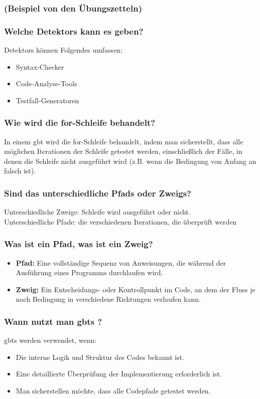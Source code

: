 \documentclass[main.tex]{subfiles}
\begin{document}
\subsubsection*{(Beispiel von den Übungszetteln)} %


\subsubsection*{Welche \glspl{Detektor} kann es geben?}
\glspl{Detektor} können Folgendes umfassen:
\begin{itemize}
    \item Syntax-Checker
    \item Code-Analyse-Tools
    \item Testfall-Generatoren
\end{itemize}

\subsubsection*{Wie wird die for-Schleife behandelt?}
In einem \gls{gbt}  wird die for-Schleife behandelt, indem man sicherstellt, dass alle möglichen Iterationen der Schleife getestet werden, einschließlich der Fälle, in denen die Schleife nicht ausgeführt wird (z.B. wenn die Bedingung von Anfang an falsch ist).


\subsubsection*{Sind das unterschiedliche \glspl{Pfad} oder \glspl{Zweig}?} %
Unterschiedliche Zweige: Schleife wird ausgeführt oder nicht. \\
Unterschiedliche Pfade: die verschiedenen Iterationen, die überprüft werden

\subsubsection*{Was ist ein \gls{Pfad}, was ist ein \gls{Zweig}?}
\begin{itemize}
    \item \textbf{Pfad:} Eine vollständige Sequenz von Anweisungen, die während der Ausführung eines Programms durchlaufen wird.
    \item \textbf{\gls{Zweig}:} Ein Entscheidungs- oder Kontrollpunkt im Code, an dem der Fluss je nach Bedingung in verschiedene Richtungen verlaufen kann.
\end{itemize}


\subsubsection*{Wann nutzt man \glspl{gbt} ?}
\glspl{gbt}  werden verwendet, wenn:
\begin{itemize}
    \item Die interne Logik und Struktur des Codes bekannt ist.
    \item Eine detaillierte Überprüfung der Implementierung erforderlich ist.
    \item Man sicherstellen möchte, dass alle Codepfade getestet werden.
\end{itemize}
\end{document}
